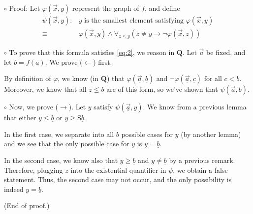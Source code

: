 \documentclass{article}
\newcommand{\RQ}{\mathbf{Q}}
\newcommand{\suc}{\mathrm{S}}
\newcommand\point[1]{\noindent \hspace{\labelsep} {\small $\circ$ #1} \smallskip}
\newcommand\proofend{\hfill(End of proof.)}
\begin{document}
\point{Proof: Let $\varphi(\vec x, y)$ represent the graph of $f$, and define
\begin{equation}
\begin{aligned}
\psi(\vec x, y) \colon &\text{$y$ is the smallest element satisfying $\varphi(\vec x, y)$}\\
\equiv\ &\varphi(\vec x, y) \land \forall_{z \leq y} (z \neq y \rightarrow \neg\varphi(\vec x, z))
\end{aligned}
\end{equation}}

\point{To prove that this formula satisfies \eqref{eq:2}, we reason in $\RQ$. Let $\vec a$ be fixed, and let $b = f(a)$. We prove ($\leftarrow$) first.

By definition of $\varphi$, we know (in $\RQ$) that $\varphi(\underline{\vec a}, \underline{b})$ and $\neg \varphi(\underline{\vec a}, \underline{c})$ for all $c < b$. Moreover, we know that all $z \leq \underline{b}$ are of this form, so we've shown that $\psi(\underline{\vec a}, \underline{b})$.}

\point{Now, we prove ($\rightarrow$). Let $y$ satisfy $\psi(\underline{\vec a}, y)$. We know from a previous lemma that either $y \leq \underline b$ or $y \geq \suc \underline b$.

In the first case, we separate into all $b$ possible cases for $y$ (by another lemma) and we see that the only possible case for $y$ is $y = \underline{b}$.

In the second case, we know also that $y \geq \underline b$ and $y \neq \underline b$ by a previous remark. Therefore, plugging $z$ into the existential quantifier in $\psi$, we obtain a false statement. Thus, the second case may not occur, and the only possibility is indeed $y = \underline b$.

\proofend}
\end{document}
